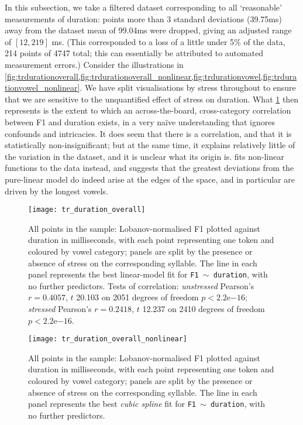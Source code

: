 In this subsection, we take a filtered dataset corresponding to all `reasonable' measurements of duration: points more than 3 standard deviations (39.75ms) away from the dataset mean of 99.04ms were dropped, giving an adjusted range of $[12,219]$ ms. (This corresponded to a loss of a little under 5\% of the data, 214 points of 4747 total; this can essentially be attributed to automated measurement errors.) Consider the illustrations in \cref{fig:trdurationoverall,fig:trdurationoverall_nonlinear,fig:trdurationvowel,fig:trdurationvowel_nonlinear}. We have split visualisations by stress throughout to ensure that we are sensitive to the unquantified effect of stress on duration. What \cref{fig:trdurationoverall} then represents is the extent to which an across-the-board, cross-category correlation between F1 and duration exists, in a very naïve understanding that ignores confounds and intricacies. It does seem that there is a correlation, and that it is statistically non-insignificant; but at the same time, it explains relatively little of the variation in the dataset, and it is unclear what its origin is.  fits non-linear functions to the data instead, and suggests that the greatest deviations from the pure-linear model do indeed arise at the edges of the space, and in particular are driven by the longest vowels.



\begin{figure}[H]
  \centering
  \texttt{[image: tr\_duration\_overall]}
  \caption[Duration plotted against F1 for all points in the sample.]{All points in the sample: Lobanov-normalised F1 plotted against duration in milliseconds, with each point representing one token and coloured by vowel category; panels are split by the presence or absence of stress on the corresponding syllable. The line in each panel represents the best linear-model fit for \texttt{F1 $\sim$ duration}, with no further predictors. Tests of correlation: \emph{unstressed} Pearson's $r = 0.4057$, $t$ 20.103 on 2051 degrees of freedom $p < 2.2$e$-16$; \emph{stressed} Pearson's $r = 0.2418$, $t$ 12.237 on 2410 degrees of freedom $p < 2.2$e$-16$.}
  \label{fig:trdurationoverall}
\end{figure}


\begin{figure}[H]
  \centering
  \texttt{[image: tr\_duration\_overall\_nonlinear]}
  \caption[Duration plotted against F1 for all points in the sample, with cubic spline fit.]{All points in the sample: Lobanov-normalised F1 plotted against duration in milliseconds, with each point representing one token and coloured by vowel category; panels are split by the presence or absence of stress on the corresponding syllable. The line in each panel represents the best \emph{cubic spline} fit for \texttt{F1 $\sim$ duration}, with no further predictors.}
  \label{fig:trdurationoverall_nonlinear}
\end{figure}


